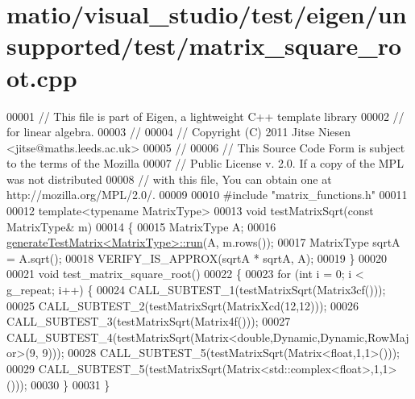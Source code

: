 \hypertarget{matio_2visual__studio_2test_2eigen_2unsupported_2test_2matrix__square__root_8cpp_source}{}\section{matio/visual\+\_\+studio/test/eigen/unsupported/test/matrix\+\_\+square\+\_\+root.cpp}
\label{matio_2visual__studio_2test_2eigen_2unsupported_2test_2matrix__square__root_8cpp_source}

\begin{DoxyCode}
00001 \textcolor{comment}{// This file is part of Eigen, a lightweight C++ template library}
00002 \textcolor{comment}{// for linear algebra.}
00003 \textcolor{comment}{//}
00004 \textcolor{comment}{// Copyright (C) 2011 Jitse Niesen <jitse@maths.leeds.ac.uk>}
00005 \textcolor{comment}{//}
00006 \textcolor{comment}{// This Source Code Form is subject to the terms of the Mozilla}
00007 \textcolor{comment}{// Public License v. 2.0. If a copy of the MPL was not distributed}
00008 \textcolor{comment}{// with this file, You can obtain one at http://mozilla.org/MPL/2.0/.}
00009 
00010 \textcolor{preprocessor}{#include "matrix\_functions.h"}
00011 
00012 \textcolor{keyword}{template}<\textcolor{keyword}{typename} MatrixType>
00013 \textcolor{keywordtype}{void} testMatrixSqrt(\textcolor{keyword}{const} MatrixType& m)
00014 \{
00015   MatrixType A;
00016   \hyperlink{structgenerate_test_matrix}{generateTestMatrix<MatrixType>::run}(A, m.rows());
00017   MatrixType sqrtA = A.sqrt();
00018   VERIFY\_IS\_APPROX(sqrtA * sqrtA, A);
00019 \}
00020 
00021 \textcolor{keywordtype}{void} test\_matrix\_square\_root()
00022 \{
00023   \textcolor{keywordflow}{for} (\textcolor{keywordtype}{int} i = 0; i < g\_repeat; i++) \{
00024     CALL\_SUBTEST\_1(testMatrixSqrt(Matrix3cf()));
00025     CALL\_SUBTEST\_2(testMatrixSqrt(MatrixXcd(12,12)));
00026     CALL\_SUBTEST\_3(testMatrixSqrt(Matrix4f()));
00027     CALL\_SUBTEST\_4(testMatrixSqrt(Matrix<double,Dynamic,Dynamic,RowMajor>(9, 9)));
00028     CALL\_SUBTEST\_5(testMatrixSqrt(Matrix<float,1,1>()));
00029     CALL\_SUBTEST\_5(testMatrixSqrt(Matrix<std::complex<float>,1,1>()));
00030   \}
00031 \}
\end{DoxyCode}
